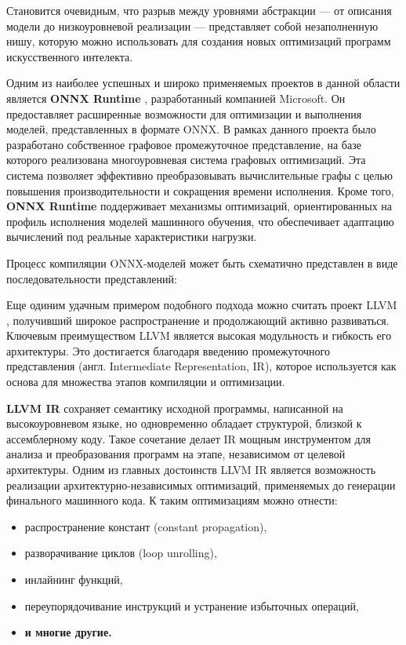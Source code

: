 Становится очевидным, что разрыв между уровнями абстракции — от описания модели до низкоуровневой реализации — представляет собой незаполненную нишу, которую можно использовать для создания новых оптимизаций программ искусственного интелекта.

Одним из наиболее успешных и широко применяемых проектов в данной области является \textbf{ONNX Runtime} \cite{onnx_main}, разработанный компанией Microsoft.
Он предоставляет расширенные возможности для оптимизации и выполнения моделей, представленных в формате ONNX.
В рамках данного проекта было разработано собственное графовое промежуточное представление, на базе которого реализована многоуровневая система графовых оптимизаций.
Эта система позволяет эффективно преобразовывать вычислительные графы с целью повышения производительности и сокращения времени исполнения.
Кроме того, \textbf{ONNX Runtime} поддерживает механизмы оптимизаций, ориентированных на профиль исполнения моделей машинного обучения, что обеспечивает адаптацию вычислений под реальные характеристики нагрузки.

Процесс компиляции ONNX-моделей может быть схематично представлен в виде последовательности представлений:
\[\]
\[\]

Еще одиним удачным примером подобного подхода можно считать проект LLVM \cite{llvm_main}, получивший широкое распространение и продолжающий активно развиваться.
Ключевым преимуществом LLVM является высокая модульность и гибкость его архитектуры.
Это достигается благодаря введению промежуточного представления (англ. Intermediate Representation, IR), которое используется как основа для множества этапов компиляции и оптимизации.

\textbf{LLVM IR} \cite{llvm_main} сохраняет семантику исходной программы, написанной на высокоуровневом языке, но одновременно обладает структурой, близкой к ассемблерному коду.
Такое сочетание делает IR мощным инструментом для анализа и преобразования программ на этапе, независимом от целевой архитектуры.
Одним из главных достоинств LLVM IR является возможность реализации архитектурно-независимых оптимизаций, применяемых до генерации финального машинного кода. К таким оптимизациям можно отнести:

\begin{itemize}
    \item распространение констант (constant propagation),
    \item разворачивание циклов (loop unrolling),
    \item инлайнинг функций,
    \item переупорядочивание инструкций и устранение избыточных операций,
    \item \textbf{и многие другие.}
\end{itemize}

